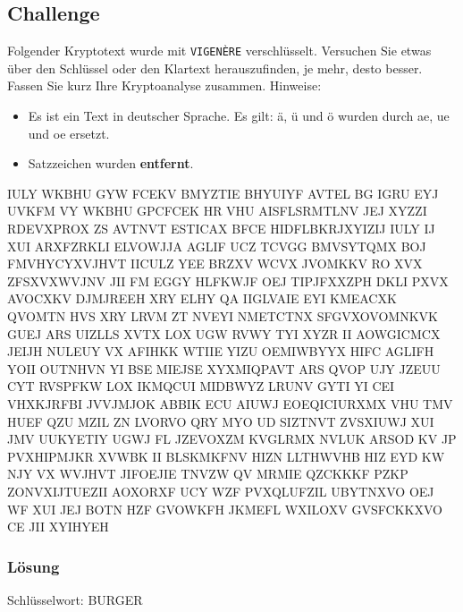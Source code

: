 \newpage

\subsection{Challenge}

Folgender Kryptotext wurde mit \texttt{VIGENÈRE} verschlüsselt. Versuchen Sie etwas über den Schlüssel oder den Klartext herauszufinden, je mehr, desto besser. Fassen Sie kurz Ihre Kryptoanalyse zusammen. Hinweise:

\begin{itemize}
	\item Es ist ein Text in deutscher Sprache. Es gilt: ä, ü und ö wurden durch ae, ue und oe ersetzt.
	\item Satzzeichen wurden \textbf{entfernt}.
\end{itemize}

\begin{spacing}{2.75}
\resetlinenumber[1]
\begin{linenumbers}
\ttfamily
IULY WKBHU GYW FCEKV BMYZTIE BHYUIYF AVTEL BG IGRU EYJ UVKFM VY WKBHU 
GPCFCEK HR VHU AISFLSRMTLNV JEJ XYZZI RDEVXPROX ZS AVTNVT ESTICAX BFCE 
HIDFLBKRJXYIZIJ IULY IJ XUI ARXFZRKLI ELVOWJJA AGLIF UCZ TCVGG BMVSYTQMX 
BOJ FMVHYCYXVJHVT IICULZ YEE BRZXV WCVX JVOMKKV RO XVX ZFSXVXWVJNV JII FM 
EGGY HLFKWJF OEJ TIPJFXXZPH DKLI PXVX AVOCXKV DJMJREEH XRY ELHY QA IIGLVAIE 
EYI KMEACXK QVOMTN HVS XRY LRVM ZT NVEYI NMETCTNX SFGVXOVOMNKVK GUEJ ARS 
UIZLLS XVTX LOX UGW RVWY TYI XYZR II AOWGICMCX JEIJH NULEUY VX AFIHKK WTIIE 
YIZU OEMIWBYYX HIFC AGLIFH YOII OUTNHVN YI BSE MIEJSE XYXMIQPAVT ARS QVOP UJY 
JZEUU CYT RVSPFKW LOX IKMQCUI MIDBWYZ LRUNV GYTI YI CEI VHXKJRFBI JVVJMJOK ABBIK 
ECU AIUWJ EOEQICIURXMX VHU TMV HUEF QZU MZIL ZN LVORVO QRY MYO UD SIZTNVT 
ZVSXIUWJ XUI JMV UUKYETIY UGWJ FL JZEVOXZM KVGLRMX NVLUK ARSOD KV JP PVXHIPMJKR 
XVWBK II BLSKMKFNV HIZN LLTHWVHB HIZ EYD KW NJY VX WVJHVT JIFOEJIE TNVZW QV 
MRMIE QZCKKKF PZKP ZONVXIJTUEZII AOXORXF UCY WZF PVXQLUFZIL UBYTNXVO OEJ WF 
XUI JEJ BOTN HZF GVOWKFH JKMEFL WXILOXV GVSFCKKXVO CE JII XYIHYEH
\end{linenumbers}
\end{spacing}

\newpage

\subsubsection{Lösung}

Schlüsselwort: BURGER

